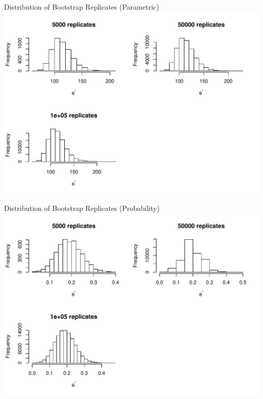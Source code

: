 \documentclass[a4paper,9pt]{beamer}\usepackage[]{graphicx}\usepackage[]{color}
\makeatletter
\def\maxwidth{ %
  \ifdim\Gin@nat@width>\linewidth
    \linewidth
  \else
    \Gin@nat@width
  \fi
}
\newenvironment{knitrout}{}{} %
\makeatother
\begin{document}
\begin{frame}{Distribution of Bootstrap Replicates (Parametric)}
\begin{knitrout}
\color{fgcolor}
\includegraphics[width=\maxwidth]{figure/plots32-1} 

\end{knitrout}
\end{frame}

\begin{frame}{Distribution of Bootstrap Replicates (Probability)}
\begin{knitrout}
\color{fgcolor}
\includegraphics[width=\maxwidth]{figure/plots33-1} 

\end{knitrout}
\end{frame}
\end{document}
